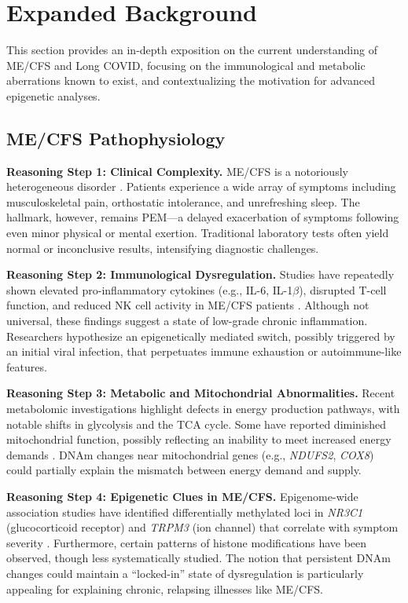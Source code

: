 \documentclass[journal]{IEEEtran}
\begin{document}
\section{Expanded Background}\label{sec:background}
This section provides an in-depth exposition on the current understanding of ME/CFS and Long COVID, focusing on the immunological and metabolic aberrations known to exist, and contextualizing the motivation for advanced epigenetic analyses.

\subsection{ME/CFS Pathophysiology}
\textbf{Reasoning Step 1: Clinical Complexity.}
ME/CFS is a notoriously heterogeneous disorder \cite{Apostolou2024reprogramming}. Patients experience a wide array of symptoms including musculoskeletal pain, orthostatic intolerance, and unrefreshing sleep. The hallmark, however, remains PEM—a delayed exacerbation of symptoms following even minor physical or mental exertion. Traditional laboratory tests often yield normal or inconclusive results, intensifying diagnostic challenges.

\textbf{Reasoning Step 2: Immunological Dysregulation.}
Studies have repeatedly shown elevated pro-inflammatory cytokines (e.g., IL-6, IL-1$\beta$), disrupted T-cell function, and reduced NK cell activity in ME/CFS patients \cite{Helliwell2020changesDNA}. Although not universal, these findings suggest a state of low-grade chronic inflammation. Researchers hypothesize an epigenetically mediated switch, possibly triggered by an initial viral infection, that perpetuates immune exhaustion or autoimmune-like features.

\textbf{Reasoning Step 3: Metabolic and Mitochondrial Abnormalities.}
Recent metabolomic investigations highlight defects in energy production pathways, with notable shifts in glycolysis and the TCA cycle. Some have reported diminished mitochondrial function, possibly reflecting an inability to meet increased energy demands \cite{Raushert2020machine}. DNAm changes near mitochondrial genes (e.g., \textit{NDUFS2}, \textit{COX8}) could partially explain the mismatch between energy demand and supply.

\textbf{Reasoning Step 4: Epigenetic Clues in ME/CFS.}
Epigenome-wide association studies have identified differentially methylated loci in \textit{NR3C1} (glucocorticoid receptor) and \textit{TRPM3} (ion channel) that correlate with symptom severity \cite{Helliwell2020changesDNA}. Furthermore, certain patterns of histone modifications have been observed, though less systematically studied. The notion that persistent DNAm changes could maintain a “locked-in” state of dysregulation is particularly appealing for explaining chronic, relapsing illnesses like ME/CFS.
\end{document}
